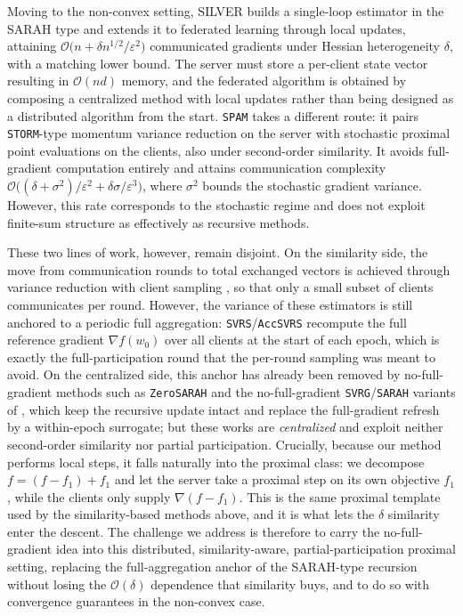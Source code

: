\documentclass{article}
\begin{document}
Moving to the non-convex setting, SILVER \cite{oko2024silver} builds a 
single-loop estimator in the SARAH type and extends it to federated 
learning through local updates, attaining 
$\mathcal{O}\bigl(n + \delta n^{1/2} /\varepsilon^{2}\bigr)$ communicated 
gradients under Hessian heterogeneity $\delta$, with a matching lower bound.   
The server must store a per-client state vector resulting in 
$\mathcal{O}(nd)$ memory, and the federated algorithm is obtained 
by composing a centralized method with local updates rather than 
being designed as a distributed algorithm from the start. 
\texttt{SPAM} \cite{karagulyan2024spamstochasticproximalpoint} takes a 
different route: it pairs \texttt{STORM}-type momentum variance reduction on 
the server with stochastic proximal point evaluations on the clients, also 
under second-order similarity. It avoids full-gradient computation entirely 
and attains communication complexity 
$\mathcal{O}\bigl((\delta  + \sigma^{2})/\varepsilon^{2} + 
\delta \sigma / \varepsilon^{3}\bigr)$, where $\sigma^2$ bounds the stochastic gradient variance. However, this rate 
corresponds to the stochastic regime and does not exploit finite-sum structure 
as effectively as recursive methods.

These two lines of work, however, remain disjoint. On the similarity side, the move from communication rounds to total exchanged vectors is achieved through variance reduction with client sampling \cite{khaled2022faster, lin2023stochastic, karagulyan2024spamstochasticproximalpoint}, so that only a small subset of clients communicates per round. However, the variance of these estimators is still anchored to a periodic full aggregation: \texttt{SVRS}/\texttt{AccSVRS} recompute the full reference gradient $\nabla f(w_0)$ over all clients at the start of each epoch, which is exactly the full-participation round that the per-round sampling was meant to avoid. On the centralized side, this anchor has already been removed by no-full-gradient methods such as \texttt{ZeroSARAH} \cite{li2021zerosarah} and the no-full-gradient \texttt{SVRG}/\texttt{SARAH} variants of \cite{medyakov2025variance}, which keep the recursive update intact and replace the full-gradient refresh by a within-epoch surrogate; but these works are \textit{centralized} and exploit neither second-order similarity nor partial participation. Crucially, because our method performs local steps, it falls naturally into the proximal class: we decompose $f = (f - f_1) + f_1$ and let the server take a proximal step on its own objective $f_1$, while the clients only supply $\nabla(f - f_1)$. This is the same proximal template used by the similarity-based methods above, and it is what lets the $\delta$ similarity enter the descent. The challenge we address is therefore to carry the no-full-gradient idea into this distributed, similarity-aware, partial-participation proximal setting, replacing the full-aggregation anchor of the SARAH-type recursion without losing the $\mathcal{O}(\delta)$ dependence that similarity buys, and to do so with convergence guarantees in the non-convex case.
\end{document}
